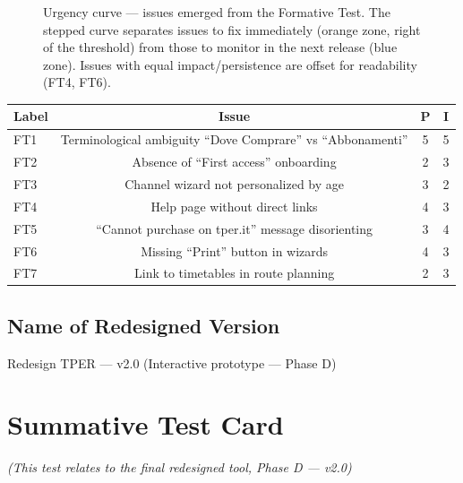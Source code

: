 ﻿\documentclass[11pt,a4paper]{article}
\begin{document}
\begin{figure}[H]
\caption{Urgency curve --- issues emerged from the Formative Test. The stepped curve
  separates issues to fix immediately (orange zone, right of the threshold) from those
  to monitor in the next release (blue zone). Issues with equal impact/persistence are
  offset for readability (FT4, FT6).}
\label{fig:urgency-curve-ft}
\end{figure}

\vspace{0.3cm}

\noindent\begin{tabular}{lccc}
\toprule
\textbf{Label} & \textbf{Issue} & \textbf{P} & \textbf{I} \\
\midrule
FT1 & Terminological ambiguity ``Dove Comprare'' vs ``Abbonamenti'' & 5 & 5 \\
FT2 & Absence of ``First access'' onboarding & 2 & 3 \\
FT3 & Channel wizard not personalized by age & 3 & 2 \\
FT4 & Help page without direct links & 4 & 3 \\
FT5 & ``Cannot purchase on tper.it'' message disorienting & 3 & 4 \\
FT6 & Missing ``Print'' button in wizards & 4 & 3 \\
FT7 & Link to timetables in route planning & 2 & 3 \\
\bottomrule
\end{tabular}

\vspace{0.2cm}

\subsection*{Name of Redesigned Version}
\begin{tcolorbox}[base]
Redesign TPER --- v2.0 (Interactive prototype --- Phase D)
\end{tcolorbox}


\newpage

\section{Summative Test Card}
\textit{(This test relates to the final redesigned tool, Phase D --- v2.0)}
\end{document}
